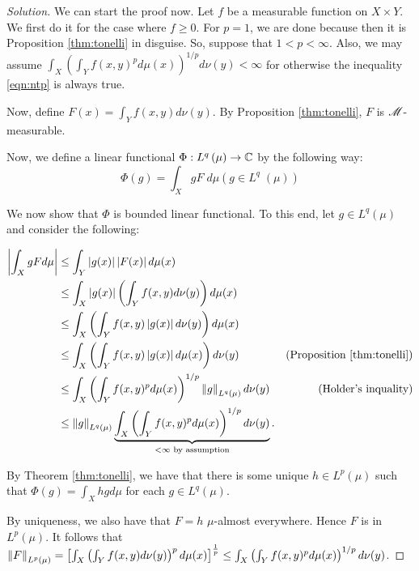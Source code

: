 \begin{proof}[Solution]
We can start the proof now. Let $f$ be a measurable function on $X \times Y$. We first do it for the case where $f\ge 0$. For $p=1$, we are done because then it is Proposition \ref{thm:tonelli} in disguise. So, suppose that $1<p< \infty$. Also, we may assume $\int_{X} \left( \int_{Y} f(x,y)^{p} d\mu (x) \right)^{1/p} d\nu (y) < \infty$ for otherwise the inequality \ref{eqn:ntp} is always true.


Now, define $F\left( x \right) = \int_{Y} f(x,y) d\nu \left( y \right)$. By Proposition \ref{thm:tonelli}, $F$ is ${\mathscr M}$-measurable.

Now, we define a linear functional $\Phi : L^{q} \left( \mu \right) \to \mathbb C$ by the following way:
\begin{equation*}
\Phi (g) =\int_{X} gF \; d\mu \left( g \in L^{q} \; \left( \mu \right) \right)
\end{equation*}

We now show that $\Phi$ is bounded linear functional. To this end, let $g \in L^{q} \left( \mu \right)$ and consider the following:

\begin{align*}
\left\lvert \int_{X} gF d\mu \right\rvert &\le \int_{Y} \left\lvert g(x) \right\rvert \left\lvert F(x) \right\rvert d\mu (x)  \\
&\le \int_{X} \left\lvert g(x) \right\rvert \left( \int_{Y} f(x,y) d\nu (y) \right) d\mu (x) \\
&\le \int_{X} \left( \int_{Y} f(x,y) \left\lvert g(x) \right\rvert d\nu (y) \right) d\mu (x) \\
&\le \int_{X} \left( \int_{Y} f(x,y) \left\lvert g(x) \right\rvert d\mu (x) \right) d\nu (y) & \left( \text{Proposition } \ref{thm:tonelli} \right) \\
&\le \int_{X} \left( \int_{Y} f(x,y)^{p} d\mu (x) \right)^{1/p} \left\lVert g \right\rVert_{L^{q} \left( \mu \right)} d\nu (y) & \left( \text{Holder's inquality} \right) \\
&\le \left\lVert g \right\rVert_{L^{q} \left( \mu \right)}  \underbrace{\int_{X} \left( \int_{Y} f(x,y)^{p} d\mu (x) \right)^{1/p} d\nu (y)}_{< \infty \text{ by assumption}}.
\end{align*}

By Theorem \ref{thm:tonelli}, we have that there is some unique $h \in L^{p} \left( \mu \right)$ such that $\Phi (g) = \int_{X} hg d\mu$ for each $g \in L^{q} \left( \mu \right)$.

By uniqueness, we also have that $F=h$ $\mu$-almost everywhere. Hence $F$ is in $L^{p} \left( \mu \right)$. It follows that $\left\lVert F \right\rVert_{L^{p} \left( \mu \right)} =  \left[\int_X \left(\int_Y f(x,y) d\nu(y) \right)^pd\mu(x)\right]^\frac{1}{p} \le \int_{X} \left( \int_{Y} f(x,y)^{p} d\mu (x) \right)^{1/p} d\nu (y)$.


\end{proof}
